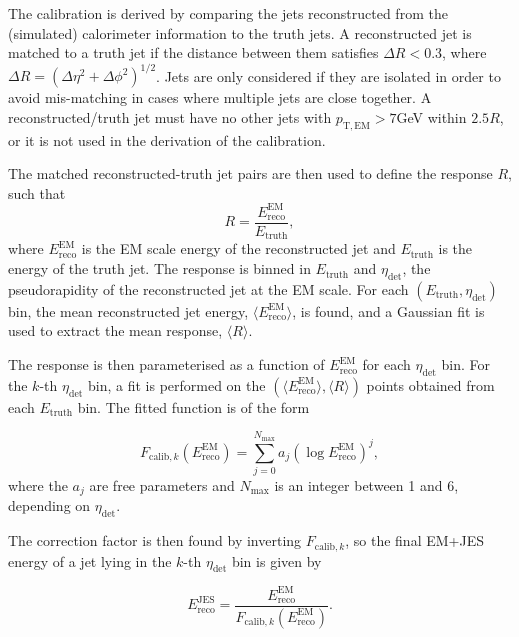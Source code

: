 The calibration is derived by comparing the jets reconstructed from the (simulated) calorimeter information to the truth jets. A reconstructed jet is matched to a truth jet if the distance between them satisfies $\Delta R < 0.3$, where $\Delta R = ( \Delta \eta^2 + \Delta \phi^2 )^{1/2}$.
Jets are only considered if they are isolated in order to avoid mis-matching in cases where multiple jets are close together. A reconstructed/truth jet must have no other jets with $p_\mathrm{T,EM} > 7 $GeV within $2.5R$, or it is not used in the derivation of the calibration. 

The matched reconstructed-truth jet pairs are then used to define the response $R$, such that 
\begin{equation}
R = \frac{E_\mathrm{reco}^\mathrm{EM}}{E_\mathrm{truth}},
\end{equation}
where $E_\mathrm{reco}^\mathrm{EM}$ is the EM scale energy of the reconstructed jet and $E_\mathrm{truth}$ is the energy of the truth jet. The response is binned in $E_\mathrm{truth}$ and $\eta_\mathrm{det}$, the pseudorapidity of the reconstructed jet at the EM scale. 
For each $(E_\mathrm{truth},\eta_\mathrm{det})$ bin, the mean reconstructed jet energy, $\langle E_\mathrm{reco}^\mathrm{EM} \rangle$, is found, and a Gaussian fit is used to extract the mean response, $\langle R \rangle$. 

The response is then parameterised as a function of $E_\mathrm{reco}^\mathrm{EM}$ for each $\eta_\mathrm{det}$ bin. 
For the $k$-th $\eta_\mathrm{det}$ bin, a fit is performed on the $(\langle E_\mathrm{reco}^\mathrm{EM} \rangle,\langle R \rangle)$ points obtained from each $E_\mathrm{truth}$ bin. The fitted function is of the form

\begin{equation}
F_{\mathrm{calib},k}(E_\mathrm{reco}^\mathrm{EM}) = \sum_{j=0}^{N_\mathrm{max}} a_j \left(\log E_\mathrm{reco}^\mathrm{EM}\right)^j,
\end{equation}
where the $a_j$ are free parameters and $N_\mathrm{max}$ is an integer between 1 and 6, depending on $\eta_\mathrm{det}$.

The correction factor is then found by inverting $F_{\mathrm{calib},k}$, so the final EM+JES energy of a jet lying in the $k$-th $\eta_\mathrm{det}$ bin is given by

\begin{equation}
E_\mathrm{reco}^\mathrm{JES} = \frac{E_\mathrm{reco}^\mathrm{EM}}{F_{\mathrm{calib},k}(E_\mathrm{reco}^\mathrm{EM})}.
\end{equation}




